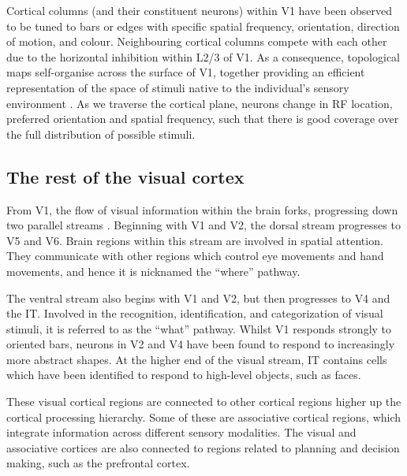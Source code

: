 Cortical columns (and their constituent neurons) within \ac{V1} have been observed to be tuned to bars or edges with specific spatial frequency, orientation, direction of motion, and colour.
Neighbouring cortical columns compete with each other due to the horizontal inhibition within \acs{L2/3} of \ac{V1}.
As a consequence, topological maps self-organise across the surface of \ac{V1}, together providing an efficient representation of the space of stimuli native to the individual's sensory environment \citep{Miikkulainen2005,Stevens2013,Wilson2015}.
As we traverse the cortical plane, neurons change in \ac{RF} location, preferred orientation and spatial frequency, such that there is good coverage over the full distribution of possible stimuli.


\subsection{The rest of the visual cortex}

From \ac{V1}, the flow of visual information within the brain forks, progressing down two parallel streams \citep{Goodale199220,Mishkin198257}.
Beginning with \ac{V1} and \ac{V2}, the dorsal stream progresses to \ac{V5} and \ac{V6}.
Brain regions within this stream are involved in spatial attention.
They communicate with other regions which control eye movements and hand movements, and hence it is nicknamed the ``where'' pathway.

The ventral stream also begins with \ac{V1} and \ac{V2}, but then progresses to \ac{V4} and the \acf{IT}.
Involved in the recognition, identification, and categorization of visual stimuli, it is referred to as the ``what'' pathway.
Whilst \ac{V1} responds strongly to oriented bars, neurons in \ac{V2} and \ac{V4} have been found to respond to increasingly more abstract shapes.
At the higher end of the visual stream, \ac{IT} contains cells which have been identified to respond to high-level objects, such as faces.%

These visual cortical regions are connected to other cortical regions higher up the cortical processing hierarchy.
Some of these are associative cortical regions, which integrate information across different sensory modalities.
The visual and associative cortices are also connected to regions related to planning and decision making, such as the prefrontal cortex.


